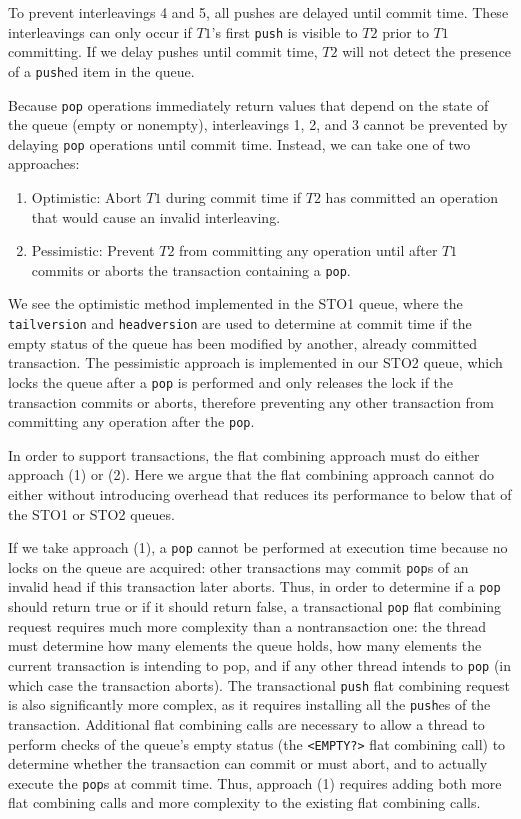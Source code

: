 To prevent interleavings 4 and 5, all pushes are delayed until commit time. These interleavings can only occur if $T1$'s first \texttt{push} is visible to $T2$ prior to $T1$ committing. If we delay pushes until commit time, $T2$ will not detect the presence of a \texttt{push}ed item in the queue.

Because \texttt{pop} operations immediately return values that depend on the state of the queue (empty or nonempty), interleavings 1, 2, and 3 cannot be prevented by delaying \texttt{pop} operations until commit time. Instead, we can take one of two approaches:
\begin{enumerate}
    \item Optimistic: Abort $T1$ during commit time if $T2$ has committed an operation that would cause an invalid interleaving.
    \item Pessimistic: Prevent $T2$ from committing any operation until after $T1$ commits or aborts the transaction containing a \texttt{pop}.
\end{enumerate}

We see the optimistic method implemented in the STO1 queue, where the \texttt{tailversion} and \texttt{headversion} are used to determine at commit time if the empty status of the queue has been modified by another, already committed transaction. The pessimistic approach is implemented in our STO2 queue, which locks the queue after a \texttt{pop} is performed and only releases the lock if the transaction commits or aborts, therefore preventing any other transaction from committing any operation after the \texttt{pop}.

In order to support transactions, the flat combining approach must do either approach (1) or (2). Here we argue that the flat combining approach cannot do either without introducing overhead that reduces its performance to below that of the STO1 or STO2 queues.

If we take approach (1), a \texttt{pop} cannot be performed at execution time because no locks on the queue are acquired: other transactions may commit \texttt{pop}s of an invalid head if this transaction later aborts. Thus, in order to determine if a \texttt{pop} should return true or if it should return false, a transactional \texttt{pop} flat combining request requires much more complexity than a nontransaction one: the thread must determine how many elements the queue holds, how many elements the current transaction is intending to pop, and if any other thread intends to \texttt{pop} (in which case the transaction aborts). The transactional \texttt{push} flat combining request is also significantly more complex, as it requires installing all the \texttt{push}es of the transaction. Additional flat combining calls are necessary to allow a thread to perform checks of the queue's empty status (the \texttt{<EMPTY?>} flat combining call) to determine whether the transaction can commit or must abort, and to actually execute the \texttt{pop}s at commit time. Thus, approach (1) requires adding both more flat combining calls and more complexity to the existing flat combining calls.

